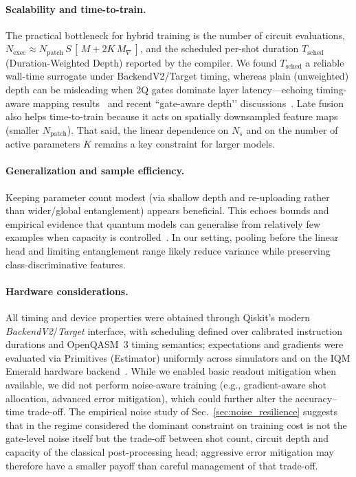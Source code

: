 \paragraph{Scalability and time-to-train.}
The practical bottleneck for hybrid training is the number of circuit evaluations,
\(
N_{\text{exec}}\!\approx\!N_{\text{patch}}\,S\,[\,M+2K\,M_{\!\nabla}\,]
\),
and the scheduled per-shot duration \(T_{\text{sched}}\) (Duration-Weighted Depth) reported by the compiler. We found \(T_{\text{sched}}\) a reliable wall-time surrogate under BackendV2/Target timing, whereas plain (unweighted) depth can be misleading when 2Q gates dominate layer latency—echoing timing-aware mapping results~\cite{Lao2020TimingMapping,Dousti2013LEQA} and recent “gate-aware depth’’ discussions~\cite{GateAwareDepth2025}. Late fusion also helps time-to-train because it acts on spatially downsampled feature maps (smaller $N_{\text{patch}}$). That said, the linear dependence on $N_s$ and on the number of active parameters $K$ remains a key constraint for larger models.

\paragraph{Generalization and sample efficiency.}
Keeping parameter count modest (via shallow depth and re-uploading rather than wider/global entanglement) appears beneficial. This echoes bounds and empirical evidence that quantum models can generalise from relatively few examples when capacity is controlled~\cite{Caro2022NatCommun}. In our setting, pooling before the linear head and limiting entanglement range likely reduce variance while preserving class-discriminative features.

\paragraph{Hardware considerations.}
All timing and device properties were obtained through Qiskit's modern \emph{BackendV2}/\emph{Target} interface, with scheduling defined over calibrated instruction durations and OpenQASM~3 timing semantics; expectations and gradients were evaluated via Primitives (Estimator) uniformly across simulators and on the IQM Emerald hardware backend~\cite{QiskitBackendV2Docs,QiskitTargetDocs,OpenQASM3TQC2022,QiskitEstimatorDocs}. While we enabled basic readout mitigation when available, we did not perform noise-aware training (e.g., gradient-aware shot allocation, advanced error mitigation), which could further alter the accuracy--time trade-off. The empirical noise study of Sec.~\ref{sec:noise_resilience} suggests that in the regime considered the dominant constraint on training cost is not the gate-level noise itself but the trade-off between shot count, circuit depth and capacity of the classical post-processing head; aggressive error mitigation may therefore have a smaller payoff than careful management of that trade-off.

